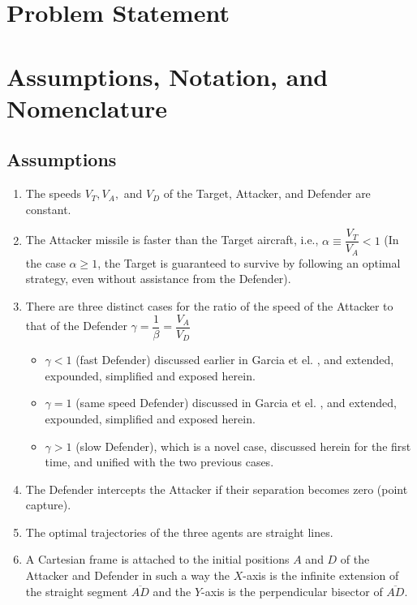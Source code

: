 \label{ATD_problem}

\section{Problem Statement}


\section{Assumptions, Notation, and Nomenclature}
\subsection*{Assumptions}
\begin{enumerate}
\item The speeds $V_{T},V_{A},$ and $V_{D}$ of the Target, Attacker, and Defender are constant.
\item The Attacker missile is faster than the Target aircraft, i.e., $\alpha\equiv \dfrac{V_{T}}{V_{A}}<1$ (In the case $\alpha\geq1$, the Target is guaranteed to survive by following an optimal strategy, even without assistance from the Defender).
\item There are three distinct cases for the ratio of the speed of the Attacker to that of the Defender $\gamma=\dfrac{1}{\beta}=\dfrac{V_{A}}{V_{D}}$ 
\begin{itemize}
\item $\gamma<1$ (fast Defender) discussed earlier in Garcia et el. \cite{garcia2015active}, and extended, expounded, simplified and exposed herein.
\item $\gamma =1$ (same speed Defender) discussed in Garcia et el. \cite{pachter2014active,garcia2015escape}, and extended, expounded, simplified and exposed herein.
\item $\gamma>1$ (slow Defender), which is a novel case, discussed herein for the first time, and unified with the two previous cases.  
\end{itemize}

\item The Defender intercepts the Attacker if their separation becomes zero (point capture).
\item The optimal trajectories of the three agents are straight lines.
\item A Cartesian frame is attached to the initial positions $A$ and $D$ of the Attacker and Defender in such a way the $X$-axis is the infinite extension of the straight segment $\overline{AD}$ and the $Y$-axis is the perpendicular bisector of $\overline{AD}$.
\end{enumerate}

